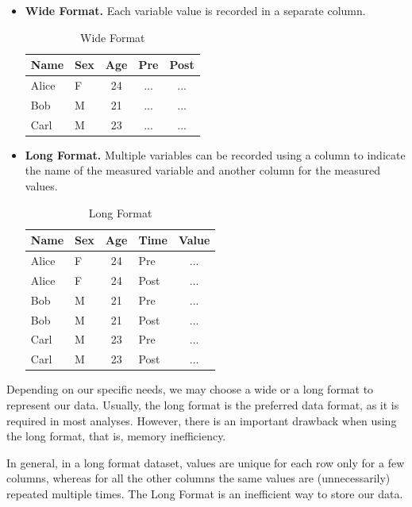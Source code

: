 \documentclass[
  11pt,
]{book}
\providecommand{\tightlist}{%
  \setlength{\itemsep}{0pt}\setlength{\parskip}{0pt}}
\begin{document}
\begin{itemize}
\tightlist
\item
  \textbf{Wide Format.} Each variable value is recorded in a separate column.

  \begin{table}[!h]

    \caption{\label{tab:unnamed-chunk-23}Wide Format}
    \centering
    \begin{tabular}[t]{llccc}
    \toprule
    Name & Sex & Age & Pre & Post\\
    \midrule
    Alice & F & 24 & ... & ...\\
    Bob & M & 21 & ... & ...\\
    Carl & M & 23 & ... & ...\\
    \bottomrule
    \end{tabular}
    \end{table}
\item
  \textbf{Long Format.} Multiple variables can be recorded using a column to indicate the name of the measured variable and another column for the measured values.

  \begin{table}[!h]

    \caption{\label{tab:unnamed-chunk-24}Long Format}
    \centering
    \begin{tabular}[t]{llclc}
    \toprule
    Name & Sex & Age & Time & Value\\
    \midrule
    Alice & F & 24 & Pre & ...\\
    Alice & F & 24 & Post & ...\\
    Bob & M & 21 & Pre & ...\\
    Bob & M & 21 & Post & ...\\
    Carl & M & 23 & Pre & ...\\
    \addlinespace
    Carl & M & 23 & Post & ...\\
    \bottomrule
    \end{tabular}
    \end{table}
\end{itemize}

Depending on our specific needs, we may choose a wide or a long format to represent our data. Usually, the long format is the preferred data format, as it is required in most analyses. However, there is an important drawback when using the long format, that is, memory inefficiency.

In general, in a long format dataset, values are unique for each row only for a few columns, whereas for all the other columns the same values are (unnecessarily) repeated multiple times. The Long Format is an inefficient way to store our data.
\end{document}
